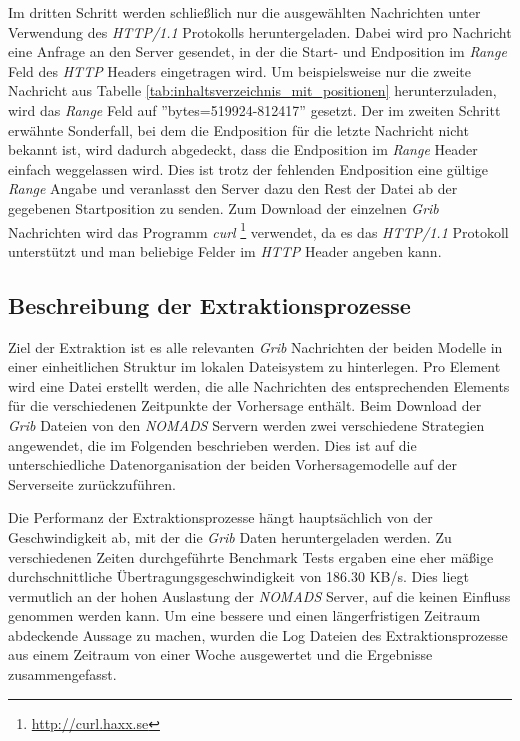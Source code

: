 Im dritten Schritt werden schließlich nur die ausgewählten Nachrichten
unter Verwendung des \textit{HTTP/1.1} Protokolls
heruntergeladen. Dabei wird pro Nachricht eine Anfrage an den Server
gesendet, in der die Start- und Endposition im \textit{Range} Feld des
\textit{HTTP} Headers eingetragen wird. Um beispielsweise nur die
zweite Nachricht aus Tabelle
\ref{tab:inhaltsverzeichnis_mit_positionen} herunterzuladen, wird das
\textit{Range} Feld auf ''bytes=519924-812417'' gesetzt. Der im
zweiten Schritt erwähnte Sonderfall, bei dem die Endposition für die
letzte Nachricht nicht bekannt ist, wird dadurch abgedeckt, dass die
Endposition im \textit{Range} Header einfach weggelassen wird. Dies
ist trotz der fehlenden Endposition eine gültige \textit{Range} Angabe
und veranlasst den Server dazu den Rest der Datei ab der gegebenen
Startposition zu senden. Zum Download der einzelnen \textit{Grib}
Nachrichten wird das Programm \textit{curl}
\footnote{\url{http://curl.haxx.se}} verwendet, da es das
\textit{HTTP/1.1} Protokoll unterstützt und man beliebige Felder im
\textit{HTTP} Header angeben kann.

\subsection{Beschreibung der Extraktionsprozesse}
Ziel der Extraktion ist es alle relevanten \textit{Grib} Nachrichten
der beiden Modelle in einer einheitlichen Struktur im lokalen
Dateisystem zu hinterlegen. Pro Element wird eine Datei erstellt
werden, die alle Nachrichten des entsprechenden Elements für die
verschiedenen Zeitpunkte der Vorhersage enthält. Beim Download der
\textit{Grib} Dateien von den \textit{NOMADS} Servern werden zwei
verschiedene Strategien angewendet, die im Folgenden beschrieben
werden. Dies ist auf die unterschiedliche Datenorganisation der beiden
Vorhersagemodelle auf der Serverseite zurückzuführen.

Die Performanz der Extraktionsprozesse hängt hauptsächlich von der
Geschwindigkeit ab, mit der die \textit{Grib} Daten heruntergeladen
werden. Zu verschiedenen Zeiten durchgeführte Benchmark Tests ergaben
eine eher mäßige durchschnittliche Übertragungsgeschwindigkeit von
186.30 KB/s. Dies liegt vermutlich an der hohen Auslastung der
\textit{NOMADS} Server, auf die keinen Einfluss genommen werden
kann. Um eine bessere und einen längerfristigen Zeitraum abdeckende
Aussage zu machen, wurden die Log Dateien des Extraktionsprozesse aus
einem Zeitraum von einer Woche ausgewertet und die Ergebnisse
zusammengefasst.

